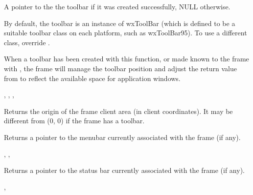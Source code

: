 A pointer to the the toolbar if it was created successfully, NULL otherwise.


By default, the toolbar is an instance of wxToolBar (which is defined to be
a suitable toolbar class on each platform, such as wxToolBar95). To use a different class,
override .

When a toolbar has been created with this function, or made known to the frame
with , the frame will manage the toolbar
position and adjust the return value from  to
reflect the available space for application windows.


,\rtfsp
{},\rtfsp
{},\rtfsp
{}

\label{wxframegetclientareaorigin}


Returns the origin of the frame client area (in client coordinates). It may be
different from (0, 0) if the frame has a toolbar.

\label{wxframegetmenubar}


Returns a pointer to the menubar currently associated with the frame (if any).


, , 

\label{wxframegetstatusbar}


Returns a pointer to the status bar currently associated with the frame (if any).


, 

\label{wxframegettitle}

